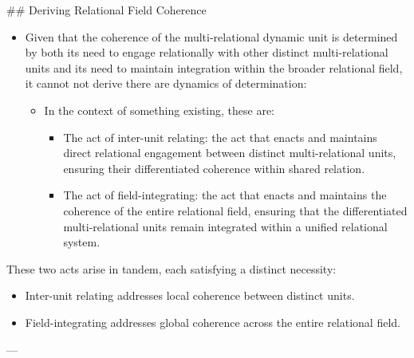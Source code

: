 \documentclass[11pt]{article}
\begin{document}
\#\# Deriving Relational Field Coherence
\begin{itemize}
\item Given that the coherence of the multi-relational dynamic unit is determined by both its need to engage relationally with other distinct multi-relational units and its need to maintain integration within the broader relational field, it cannot not derive there are dynamics of determination:

\begin{itemize}
\item In the context of something existing, these are:

\begin{itemize}
\item The act of inter-unit relating: the act that enacts and maintains direct relational engagement between distinct multi-relational units, ensuring their differentiated coherence within shared relation.

\item The act of field-integrating: the act that enacts and maintains the coherence of the entire relational field, ensuring that the differentiated multi-relational units remain integrated within a unified relational system.
\end{itemize}
\end{itemize}
\end{itemize}


These two acts arise in tandem, each satisfying a distinct necessity:

\begin{itemize}
\item Inter-unit relating addresses local coherence between distinct units.

\item Field-integrating addresses global coherence across the entire relational field.
\end{itemize}


---
\end{document}
